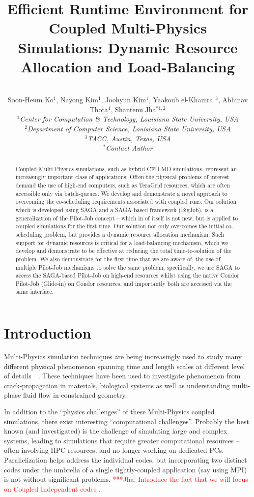 \documentclass[conference,final]{IEEEtran}
\title{Efficient Runtime Environment for Coupled Multi-Physics Simulations: Dynamic Resource Allocation and Load-Balancing}
\author{
  ~\\[-2em]
  Soon-Heum Ko$^{1}$, Nayong Kim$^{1}$, Joohyun Kim$^{1}$, Yaakoub el-Khamra $^{3}$, Abhinav Thota$^{1}$, Shantenu Jha$^{*1,2}$\\
  \small{\emph{$^{1}$Center for Computation \& Technology, Louisiana State University, USA}}\\
  \small{\emph{$^{2}$Department of Computer Science, Louisiana State University, USA}}\\
  \small{\emph{$^{3}$TACC, Austin, Texas, USA}}\\
  \small{\emph{$^{*}$Contact Author}}\\
}
\newcommand{\jhanote}[1]{ {\textcolor{red} { ***Jha: #1 }}}
\newcommand{\jhanote}[1]{}
\begin{document}
\maketitle

\begin{abstract}
  Coupled Multi-Physics simulations, such as hybrid CFD-MD simulations, represent an increasingly important class of applications.  Often the physical problems of interest demand the use of high-end computers, such as TeraGrid resources, which are often accessible only via batch-queues.  We develop and demonstrate a novel approach to overcoming the co-scheduling requirements associated with coupled runs.  Our solution which is developed using SAGA and a SAGA-based framework (BigJob), is a generalization of the Pilot-Job concept -- which in of itself is not new, but is applied to coupled simulations for the first time.  Our solution not only overcomes the initial co-scheduling problem, but provides a dynamic resource allocation mechanism. Such support for dynamic resources is critical for a load-balancing mechanism, which we develop and demonstrate to be effective at reducing the total time-to-solution of the problem.  We also demonstrate for the first time that we are aware of, the use of multiple Pilot-Job mechanisms to solve the same problem; specifically, we use SAGA to access the SAGA-based Pilot-Job on high-end resources whilst using the native Condor Pilot-Job (Glide-in) on Condor resources, and importantly both are accessed via the same interface. 
\end{abstract}


\section{Introduction} 

Multi-Physics simulation techniques are being increasingly used to study many different physical phenomenon spanning time and length scales at different level of details~\cite{Tai}~\cite{Watanabe}. These techniques have been used to investigate phenomenon from crack-propagation in materials, biological systems as well as understanding multi-phase fluid flow in constrained geometry.

In addition to the ``physics challenges'' of these Multi-Physics coupled simulations, there exist interesting ``computational challenges''.  Probably the best known (and investigated) is the challenge of simulating large and complex systems, leading to simulations that require greater computational resources -- often involving HPC resources, and no longer working on dedicated PCs. Parallelization helps address the individual codes, but incorporating two distinct codes under the umbrella of a single tightly-coupled application (say using MPI) is not without significant problems.  \jhanote{Introduce the fact that we will focus on Coupled Independent codes}. 
\end{document}
